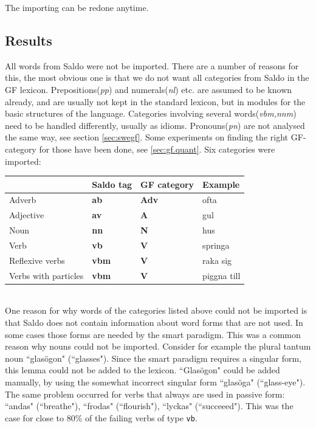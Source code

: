 \documentclass{report}
\begin{document}
The importing can be redone anytime.

\subsection{Results}
All words from Saldo were not be imported. There are a number of reasons
for this, the most obvious one is that we do not want all categories from
Saldo in the GF lexicon. Prepositions(\emph{pp}) and numerals(\emph{nl}) etc. are
assumed to be known already,
and are usually not kept in the standard lexicon, but in modules for the basic
structures of the language. Categories involving several words(\emph{vbm,nnm})
need to be handled differently, usually as idioms. Pronouns(\emph{pn}) are not  
analysed the same way, see section \ref{sec:swegf}. Some experiments on finding
the right GF-category for those have been done, see \ref{sec:gf.quant}.
Six categories were imported: \\
\begin{tabular}{l|lll}
& Saldo tag & GF category & Example \\
\hline
 Adverb & \textbf{ab} &\textbf{Adv} & ofta \\
 Adjective&\textbf{av} &    \textbf{A} & gul\\
 Noun & \textbf{nn} &\textbf{N} & hus\\
 Verb & \textbf{vb} &\textbf{V} & springa\\
 Reflexive verbs  &\textbf{vbm}& \textbf{V} & raka sig\\
 Verbs with particles &\textbf{vbm}& \textbf{V}  &  piggna till\\
\end{tabular}\\

%
One reason for why words of the categories listed above could not be imported
is that Saldo does not contain information about word forms that are not used.
In some cases those forms are needed by the smart paradigm. 
This was a common reason why nouns could not be imported. 
Consider for example
the plural tantum %
noun ``glasögon" (``glasses"). Since the smart paradigm
requires a singular form, this lemma could not be added to the lexicon. ``Glasögon" could
be added manually, by using the somewhat incorrect singular form ``glasöga" (``glass-eye").
The same problem occurred for verbs that always are used in passive form:
``andas" (``breathe"), ``frodas" (``flourish"), ``lyckas" (``succeeed"). This
was the case for close to 80\% of the failing verbs of type \verb_vb_.
\end{document}
